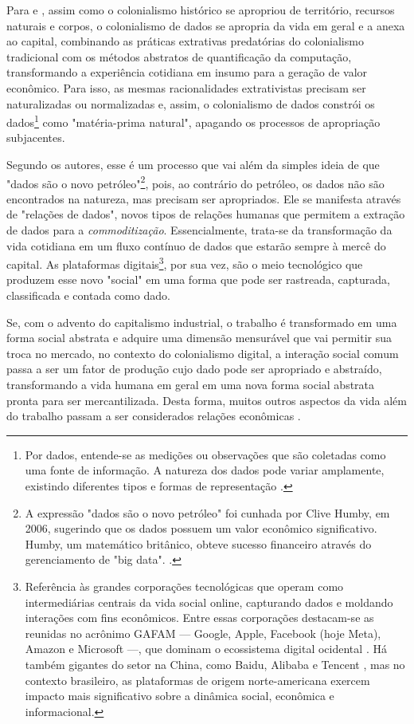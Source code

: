 Para  e , assim como o colonialismo histórico se apropriou de território, recursos naturais e corpos, o colonialismo de dados se apropria da vida em geral e a anexa ao capital, combinando as práticas extrativas predatórias do colonialismo tradicional com os métodos abstratos de quantificação da computação, transformando a experiência cotidiana em insumo para a geração de valor econômico. Para isso, as mesmas racionalidades extrativistas precisam ser naturalizadas ou normalizadas e, assim, o  colonialismo de dados constrói os dados\footnote{
Por dados, entende-se as medições ou observações que são coletadas como uma fonte de informação. A natureza dos dados pode variar amplamente, existindo diferentes tipos e formas de representação \cite{data_2025}.
} como "matéria-prima natural", apagando os processos de apropriação subjacentes.

Segundo os autores, esse é um processo que vai além da simples ideia de que "dados são o novo petróleo"\footnote{
A expressão "dados são o novo petróleo" foi cunhada por Clive Humby, em 2006, sugerindo que os dados possuem um valor econômico significativo. Humby, um matemático britânico, obteve sucesso financeiro através do gerenciamento de "big data". \cite{arthur_2013}.
}, pois, ao contrário do petróleo, os dados não são encontrados na natureza, mas precisam ser apropriados. Ele se manifesta através de "relações de dados", novos tipos de relações humanas que permitem a extração de dados para a \textit{commoditização}. Essencialmente, trata-se da transformação da vida cotidiana em um fluxo contínuo de dados que estarão sempre à mercê do capital. As plataformas digitais\footnote{\label{nota:plataformasDigitais}
Referência às grandes corporações tecnológicas que operam como intermediárias centrais da vida social online, capturando dados e moldando interações com fins econômicos. Entre essas corporações destacam-se as reunidas no acrônimo GAFAM — Google, Apple, Facebook (hoje Meta), Amazon e Microsoft —, que dominam o ecossistema digital ocidental \cite{couldry2018, Silveira2021, Reis2024, röhe_2024}. Há também gigantes do setor na China, como Baidu, Alibaba e Tencent \cite{couldry2018}, mas no contexto brasileiro, as plataformas de origem norte-americana exercem impacto mais significativo sobre a dinâmica social, econômica e informacional.
}, por sua vez, são o meio tecnológico que produzem esse novo "social" em uma forma que pode ser rastreada, capturada, classificada e contada como dado. 

Se, com o advento do capitalismo industrial, o trabalho é transformado em uma forma social abstrata e adquire uma dimensão mensurável que vai permitir sua troca no mercado, no contexto do colonialismo digital, a interação social comum passa a ser um fator de produção cujo dado pode ser apropriado e abstraído, transformando a vida humana em geral em uma nova forma social abstrata pronta para ser mercantilizada. Desta forma, muitos outros aspectos da vida além do trabalho passam a ser considerados relações econômicas \cite{couldry2018}.

